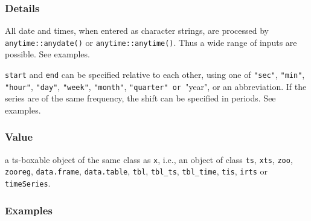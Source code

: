 \documentclass[
  letterpaper,
  DIV=11,
  numbers=noendperiod]{scrreport}
\begin{document}
\subsubsection{Details}\label{details-6}

All date and times, when entered as character strings, are processed by
\texttt{anytime::anydate()} or \texttt{anytime::anytime()}. Thus a wide
range of inputs are possible. See examples.

\texttt{start} and \texttt{end} can be specified relative to each other,
using one of \texttt{"sec"}, \texttt{"min"}, \texttt{"hour"},
\texttt{"day"}, \texttt{"week"}, \texttt{"month"},
\texttt{⁠"quarter"\ or\ ⁠}"year", or an abbreviation. If the series are of
the same frequency, the shift can be specified in periods. See examples.

\subsubsection{Value}\label{value-12}

a ts-boxable object of the same class as \texttt{x}, i.e., an object of
class \texttt{ts}, \texttt{xts}, \texttt{zoo}, \texttt{zooreg},
\texttt{data.frame}, \texttt{data.table}, \texttt{tbl},
\texttt{tbl\_ts}, \texttt{tbl\_time}, \texttt{tis}, \texttt{irts} or
\texttt{timeSeries}.

\subsubsection{Examples}\label{examples-12}
\end{document}

